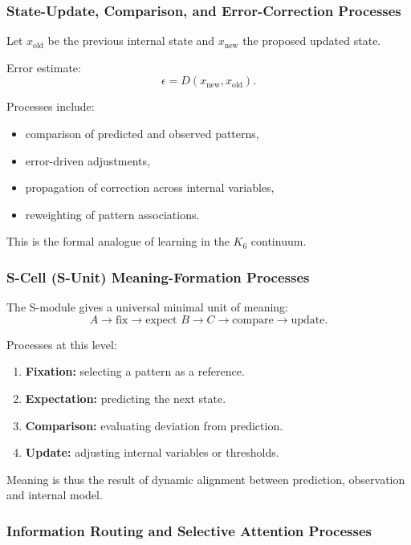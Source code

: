 \subsubsection{State-Update, Comparison, and Error-Correction Processes}

Let $x_{\text{old}}$ be the previous internal state and 
$x_{\text{new}}$ the proposed updated state.

Error estimate:
\[
\epsilon = D(x_{\text{new}}, x_{\text{old}}).
\]

Processes include:
\begin{itemize}
    \item comparison of predicted and observed patterns,
    \item error-driven adjustments,
    \item propagation of correction across internal variables,
    \item reweighting of pattern associations.
\end{itemize}

This is the formal analogue of learning in the $K_6$ continuum.

\subsubsection{S-Cell (S-Unit) Meaning-Formation Processes}

The S-module gives a universal minimal unit of meaning:
\[
A \to \text{fix} \to \text{expect } B \to C \to \text{compare} \to 
\text{update}.
\]

Processes at this level:
\begin{enumerate}
    \item \textbf{Fixation:}  
    selecting a pattern as a reference.
    \item \textbf{Expectation:}  
    predicting the next state.
    \item \textbf{Comparison:}  
    evaluating deviation from prediction.
    \item \textbf{Update:}  
    adjusting internal variables or thresholds.
\end{enumerate}

Meaning is thus the result of dynamic alignment between prediction, 
observation and internal model.

\subsubsection{Information Routing and Selective Attention Processes}

